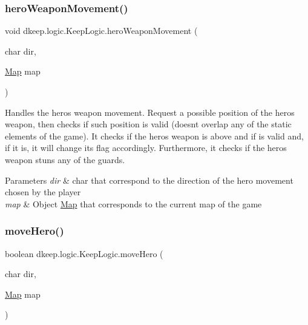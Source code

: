 \mbox{\label{classdkeep_1_1logic_1_1_keep_logic_a4f6646f5672e33e69d2d16e759223775}} 
\subsubsection{\texorpdfstring{hero\+Weapon\+Movement()}{heroWeaponMovement()}}
{\footnotesize\ttfamily void dkeep.\+logic.\+Keep\+Logic.\+hero\+Weapon\+Movement (\begin{DoxyParamCaption}\item[{char}]{dir,  }\item[{\hyperlink{classdkeep_1_1logic_1_1_map}{Map}}]{map }\end{DoxyParamCaption})}

Handles the hero\textquotesingle{}s weapon movement. Request a possible position of the hero\textquotesingle{}s weapon, then checks if such position is valid (doesn\textquotesingle{}t overlap any of the static elements of the game). It checks if the hero\textquotesingle{}s weapon is above and if is valid and, if it is, it will change it\textquotesingle{}s flag accordingly. Furthermore, it checks if the hero\textquotesingle{}s weapon stuns any of the guards. 
\begin{DoxyParams}{Parameters}
{\em dir} & char that correspond to the direction of the hero movement chosen by the player \\
\hline
{\em map} & Object \hyperlink{classdkeep_1_1logic_1_1_map}{Map} that corresponds to the current map of the game \\
\hline
\end{DoxyParams}
\mbox{\label{classdkeep_1_1logic_1_1_keep_logic_aee771ab14d616048b4257d7cecaad640}} 
\subsubsection{\texorpdfstring{move\+Hero()}{moveHero()}}
{\footnotesize\ttfamily boolean dkeep.\+logic.\+Keep\+Logic.\+move\+Hero (\begin{DoxyParamCaption}\item[{char}]{dir,  }\item[{\hyperlink{classdkeep_1_1logic_1_1_map}{Map}}]{map }\end{DoxyParamCaption})}

